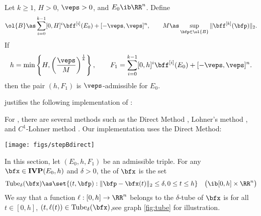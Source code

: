 	\bleml[ad]\ \\
	Let $ k \geq 1 $, $ H > 0 $, $ \veps > 0 $, and 
	$ E_0 \ib \RR^n $. Define  
	\[
		\ol{B} \as \sum_{i=0}^{k-1} [0, H]^i \bff^{[i]}(E_0)
				+ 	[-\veps, \veps]^n, \qquad
		M \as \sup_{\bfp \in \ol{B}} \| \bff^{[k]}(\bfp) \|_2.
	\]  
	If
	\[
		h = \min \left\{ H, \left( \frac{\veps}{M} 	\right)^{\frac{1}{k}}
				\right\},  \qquad
		F_1 = \sum_{i=0}^{k-1} [0, h]^i \bff^{[i]}(E_0) + 
			[-\veps, \veps]^n.
	\]  
	then the pair $(h, F_1)$ is $\veps$-admissible for $E_0$.
	\eleml
	
	 justifies the following implementation of \stepA:
	
	\Ldent{}
	
	
	For \stepb, there are several methods such as
	the Direct Method \cite{nedialkov+2:validated-ode:99},
	Lohner's method \cite{lohner:thesis},
	and $C^1$-Lohner method \cite{wilczak-zgliczynski:lohner:11}.
	Our implementation uses the Direct Method:

		\texttt{[image: figs/stepBdirect]}
	\eeql
	
\label{sec-ne}
	In this section, let $(E_0, h, F_1)$ be an admissible triple.
	For any $\bfx \in \IVP(E_0, h)$ and
	$\delta>0$, the  of $\bfx$ is
	the set
		$$\Tube_\delta(\bfx) \as
				\set{(t,\bfp): \|\bfp-\bfx(t)\|_2 \le \delta, 0\le t\le h}
				\quad \big(\ib [0,h]\times\RR^n\big)$$
	We say that a function $\ell: [0,h]\to\RR^n$ belongs to the
	$\delta$-tube of $\bfx$ is for all $t\in[0,h]$,
	$(t,\ell(t)) \in \Tube_\delta(\bfx)$,see graph \ref{fig:tube} for
	illustration.
	
